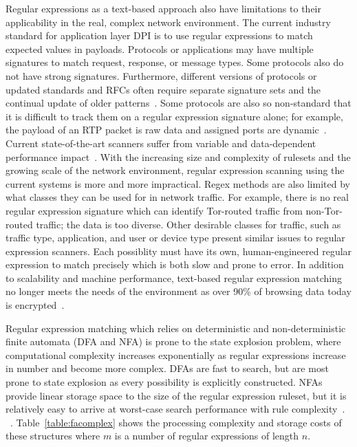 Regular expressions as a text-based approach also have limitations to their applicability in the real, complex network environment. The current industry standard for application layer DPI is to use regular expressions to match expected values in payloads. Protocols or applications may have multiple signatures to match request, response, or message types. Some protocols also do not have strong signatures. Furthermore, different versions of protocols or updated standards and RFCs often require separate signature sets and the continual update of older patterns~\cite{rexactor}. Some protocols are also so non-standard that it is difficult to track them on a regular expression signature alone; for example, the payload of an RTP packet is raw data and assigned ports are dynamic~\cite{rfc3550}. Current state-of-the-art scanners suffer from variable and data-dependent performance impact~\cite{deepmatch}. With the increasing size and complexity of rulesets and the growing scale of the network environment, regular expression scanning using the current systems is more and more impractical. Regex methods are also limited by what classes they can be used for in network traffic. For example, there is no real regular expression signature which can identify Tor-routed traffic from non-Tor-routed traffic; the data is too diverse. Other desirable classes for traffic, such as traffic type, application, and user or device type present similar issues to regular expression scanners. Each possiblity must have its own, human-engineered regular expression to match precisely which is both slow and prone to error. In addition to scalability and machine performance, text-based regular expression matching no longer meets the needs of the environment as over 90\% of browsing data today is encrypted~\cite{google}.

Regular expression matching which relies on deterministic and non-deterministic finite automata (DFA and NFA) is prone to the state explosion problem, where computational complexity increases exponentially as regular expressions increase in number and  become more complex. DFAs are fast to search, but are most prone to state explosion as every possibility is explicitly constructed. NFAs provide linear storage space to the size of the regular expression ruleset, but it is relatively easy to arrive at worst-case search performance with rule complexity~\cite{alpinepalm}. ~\cite{Fu}. Table~\ref{table:facomplex} shows the processing complexity and storage costs of these structures where $m$ is a number of regular expressions of length $n$.

